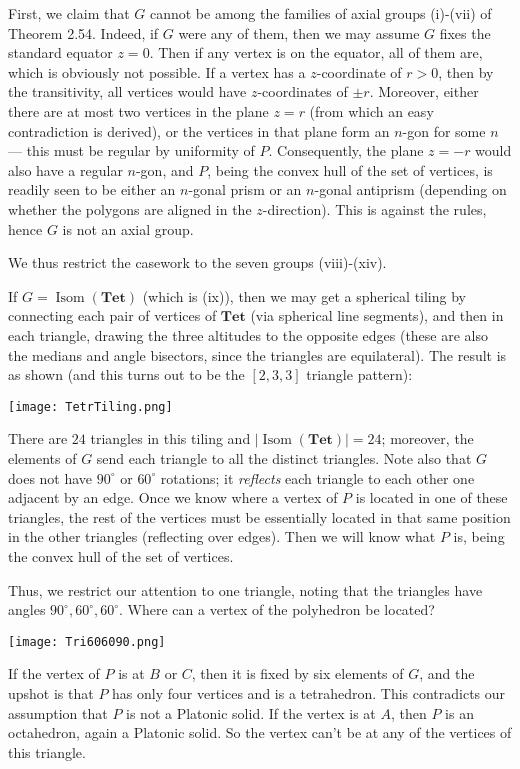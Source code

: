 \documentclass[leqno]{book}
\begin{document}
First, we claim that $G$ cannot be among the families of axial groups (i)-(vii) of Theorem 2.54.  Indeed, if $G$ were any of them, then we may assume $G$ fixes the standard equator $z=0$.  Then if any vertex is on the equator, all of them are, which is obviously not possible.  If a vertex has a $z$-coordinate of $r>0$, then by the transitivity, all vertices would have $z$-coordinates of $\pm r$.  Moreover, either there are at most two vertices in the plane $z=r$ (from which an easy contradiction is derived), or the vertices in that plane form an $n$-gon for some $n$ \---- this must be regular by uniformity of $P$.  Consequently, the plane $z=-r$ would also have a regular $n$-gon, and $P$, being the convex hull of the set of vertices, is readily seen to be either an $n$-gonal prism or an $n$-gonal antiprism  (depending on whether the polygons are aligned in the $z$-direction).  This is against the rules, hence $G$ is not an axial group.

We thus restrict the casework to the seven groups (viii)-(xiv).

If $G=\operatorname{Isom}(\mathbf{Tet})$ (which is (ix)), then we may get a spherical tiling by connecting each pair of vertices of $\mathbf{Tet}$ (via spherical line segments), and then in each triangle, drawing the three altitudes to the opposite edges (these are also the medians and angle bisectors, since the triangles are equilateral).  The result is as shown (and this turns out to be the $[2,3,3]$ triangle pattern):
\begin{center}
\texttt{[image: TetrTiling.png]} %
\end{center}
There are $24$ triangles in this tiling and $|\operatorname{Isom}(\mathbf{Tet})|=24$; moreover, the ele\-ments of $G$ send each triangle to all the distinct triangles.  Note also that $G$ does not have $90^\circ$ or $60^\circ$ rotations; it \emph{reflects} each triangle to each other one adjacent by an edge.  Once we know where a vertex of $P$ is located in one of these triangles, the rest of the vertices must be essentially located in that same position in the other triangles (reflecting over edges).  Then we will know what $P$ is, being the convex hull of the set of vertices. %

Thus, we restrict our attention to one triangle, noting that the triangles have angles $90^\circ,60^\circ,60^\circ$.  Where can a vertex of the polyhedron be located?
\begin{center}
\texttt{[image: Tri606090.png]}
\end{center}
If the vertex of $P$ is at $B$ or $C$, then it is fixed by six elements of $G$, and the upshot is that $P$ has only four vertices and is a tetrahedron.  This contradicts our assumption that $P$ is not a Platonic solid.  If the vertex is at $A$, then $P$ is an octahedron, again a Platonic solid.  So the vertex can't be at any of the vertices of this triangle.
\end{document}
